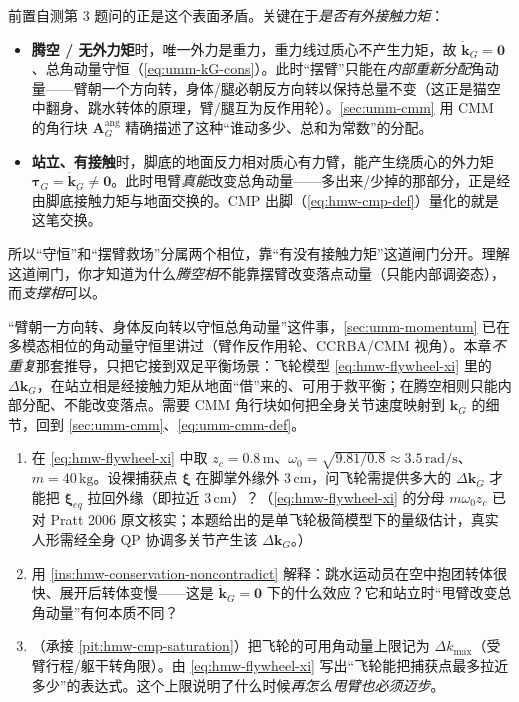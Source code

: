 \begin{insight}\label{ins:hmw-conservation-noncontradict}
前置自测第 3 题问的正是这个表面矛盾。关键在于\emph{是否有外接触力矩}：
\begin{itemize}
  \item \textbf{腾空 / 无外力矩}时，唯一外力是重力，重力线过质心不产生力矩，故 $\dot{\mathbf k}_G=\mathbf 0$、总角动量守恒（\cref{eq:umm-kG-cons}）。此时“摆臂”只能在\emph{内部重新分配}角动量——臂朝一个方向转，身体/腿必朝反方向转以保持总量不变（这正是猫空中翻身、跳水转体的原理，臂/腿互为反作用轮）。\cref{sec:umm-cmm} 用 CMM 的角行块 $\mathbf A_G^{\mathrm{ang}}$ 精确描述了这种“谁动多少、总和为常数”的分配。
  \item \textbf{站立、有接触}时，脚底的地面反力相对质心有力臂，能产生绕质心的外力矩 $\boldsymbol\tau_G=\dot{\mathbf k}_G\ne\mathbf 0$。此时甩臂\emph{真能}改变总角动量——多出来/少掉的那部分，正是经由脚底接触力矩与地面交换的。CMP 出脚（\cref{eq:hmw-cmp-def}）量化的就是这笔交换。
\end{itemize}
所以“守恒”和“摆臂救场”分属两个相位，靠“有没有接触力矩”这道闸门分开。理解这道闸门，你才知道为什么\emph{腾空相}不能靠摆臂改变落点动量（只能内部调姿态），而\emph{支撑相}可以。
\end{insight}

\begin{note}\label{note:hmw-arm-reaction-wheel}
“臂朝一方向转、身体反向转以守恒总角动量”这件事，\cref{sec:umm-momentum} 已在多模态相位的角动量守恒里讲过（臂作反作用轮、CCRBA/CMM 视角）。本章\emph{不重复}那套推导，只把它接到双足平衡场景：飞轮模型 \cref{eq:hmw-flywheel-xi} 里的 $\Delta\mathbf k_G$，在站立相是经接触力矩从地面“借”来的、可用于救平衡；在腾空相则只能内部分配、不能改变落点。需要 CMM 角行块如何把全身关节速度映射到 $\mathbf k_G$ 的细节，回到 \cref{sec:umm-cmm}、\cref{eq:umm-cmm-def}。
\end{note}

\begin{practice}
\begin{enumerate}
  \item 在 \cref{eq:hmw-flywheel-xi} 中取 $z_c=0.8\,\mathrm{m}$、$\omega_0=\sqrt{9.81/0.8}\approx 3.5\,\mathrm{rad/s}$、$m=40\,\mathrm{kg}$。设裸捕获点 $\boldsymbol\xi$ 在脚掌外缘外 $3\,\mathrm{cm}$，问飞轮需提供多大的 $\Delta\mathbf k_G$ 才能把 $\boldsymbol\xi_{eq}$ 拉回外缘（即拉近 $3\,\mathrm{cm}$）？（\cref{eq:hmw-flywheel-xi} 的分母 $m\omega_0 z_c$ 已对 Pratt 2006 原文核实；本题给出的是单飞轮极简模型下的量级估计，真实人形需经全身 QP 协调多关节产生该 $\Delta\mathbf k_G$。）
  \item 用 \cref{ins:hmw-conservation-noncontradict} 解释：跳水运动员在空中抱团转体很快、展开后转体变慢——这是 $\dot{\mathbf k}_G=\mathbf 0$ 下的什么效应？它和站立时“甩臂改变总角动量”有何本质不同？
  \item （承接 \cref{pit:hmw-cmp-saturation}）把飞轮的可用角动量上限记为 $\Delta k_{\max}$（受臂行程/躯干转角限）。由 \cref{eq:hmw-flywheel-xi} 写出“飞轮能把捕获点最多拉近多少”的表达式。这个上限说明了什么时候\emph{再怎么甩臂也必须迈步}。
\end{enumerate}
\end{practice}


